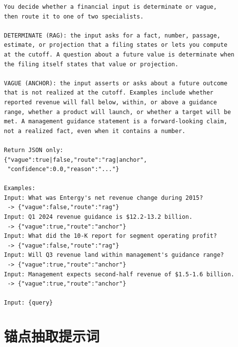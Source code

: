 \begin{lstlisting}[basicstyle=\ttfamily\scriptsize,breaklines=true,columns=fullflexible,frame=single,numbers=none]
You decide whether a financial input is determinate or vague,
then route it to one of two specialists.

DETERMINATE (RAG): the input asks for a fact, number, passage,
estimate, or projection that a filing states or lets you compute
at the cutoff. A question about a future value is determinate when
the filing itself states that value or projection.

VAGUE (ANCHOR): the input asserts or asks about a future outcome
that is not realized at the cutoff. Examples include whether
reported revenue will fall below, within, or above a guidance
range, whether a product will launch, or whether a target will be
met. A management guidance statement is a forward-looking claim,
not a realized fact, even when it contains a number.

Return JSON only:
{"vague":true|false,"route":"rag|anchor",
 "confidence":0.0,"reason":"..."}

Examples:
Input: What was Entergy's net revenue change during 2015?
 -> {"vague":false,"route":"rag"}
Input: Q1 2024 revenue guidance is $12.2-13.2 billion.
 -> {"vague":true,"route":"anchor"}
Input: What did the 10-K report for segment operating profit?
 -> {"vague":false,"route":"rag"}
Input: Will Q3 revenue land within management's guidance range?
 -> {"vague":true,"route":"anchor"}
Input: Management expects second-half revenue of $1.5-1.6 billion.
 -> {"vague":true,"route":"anchor"}

Input: {query}
\end{lstlisting}

\section{锚点抽取提示词}

